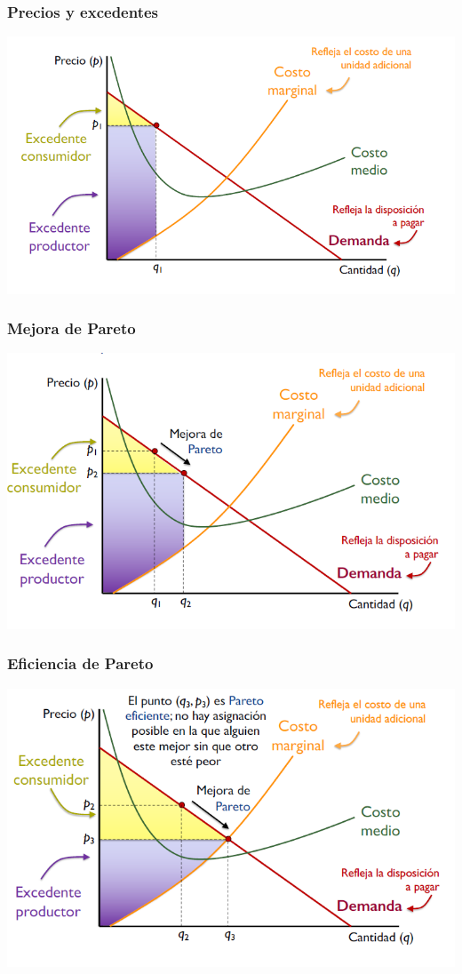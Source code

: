 \documentclass{beamer}
\begin{document}
\begin{frame}
\frametitle{ Precios y excedentes}
\includegraphics[scale=0.6]{Figures/Tema_06.38_excedente1.png}
\end{frame}

\begin{frame}
\frametitle{Mejora de Pareto}
\includegraphics[scale=0.6]{Figures/Tema_06.39_excedente2.png}
\end{frame}

\begin{frame}
\frametitle{Eficiencia de Pareto}
\includegraphics[scale=0.6]{Figures/Tema_06.40_excedente3.png}
\end{frame}
\end{document}
